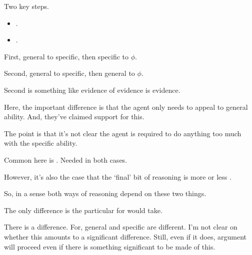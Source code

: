 \begin{note}
  Two key steps.
  \begin{itemize}
  \item \gsi{}.
  \item {}.
  \end{itemize}

  First, general to specific, then specific to \(\phi\).

  Second, general to specific, then general to \(\phi\).
\end{note}

\begin{note}
  Second is something like evidence of evidence is evidence.

  Here, the important difference is that the agent only needs to appeal to general ability.
  And, they've claimed support for this.

  The point is that it's not clear the agent is required to do anything too much with the specific ability.
\end{note}

\begin{note}[Focus]
  Common here is \gsi{}.
  Needed in both cases.

  However, it's also the case that the `final' bit of reasoning is more or less .

  So, in a sense both ways of reasoning depend on these two things.

  The only difference is the particular for  would take.

  There is a difference.
  For, general and specific are different.
  I'm not clear on whether this amounts to a significant difference.
  Still, even if it does, argument will proceed even if there is something significant to be made of this.
\end{note}

